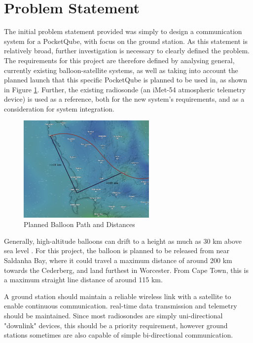 \graphicspath{{./figures/}}

\section{Problem Statement}

The initial problem statement provided was simply to design a communication system for a PocketQube, with focus on the ground station. As this statement is relatively broad, further investigation is necessary to clearly defined the problem. The requirements for this project are therefore defined by analysing general, currently existing balloon-satellite systems, as well as taking into account the planned launch that this specific PocketQube is planned to be used in, as shown in Figure \ref{fig:balloon_path}. Further, the existing radiosonde (an iMet-54 atmospheric telemetry device) is used as a reference, both for the new system's requirements, and as a consideration for system integration.

\begin{figure}[!htb]
  \centering
  \includegraphics[width=0.6\textwidth]{balloon_path}
  \caption{Planned Balloon Path and Distances}
  \label{fig:balloon_path}
\end{figure}

Generally, high-altitude balloons can drift to a height as much as 30 km above sea level \cite{site-weatherWeatherBalloons}. For this project, the balloon is planned to be released from near Saldanha Bay, where it could travel a maximum distance of around 200 km towards the Cederberg, and land furthest in Worcester. From Cape Town, this is a maximum straight line distance of around 115 km. 

A ground station should maintain a reliable wireless link with a satellite to enable continuous communication. real-time data transmission and telemetry should be maintained. Since most radiosondes are simply uni-directional "downlink" devices, this should be a priority requirement, however ground stations sometimes are also capable of simple bi-directional communication.